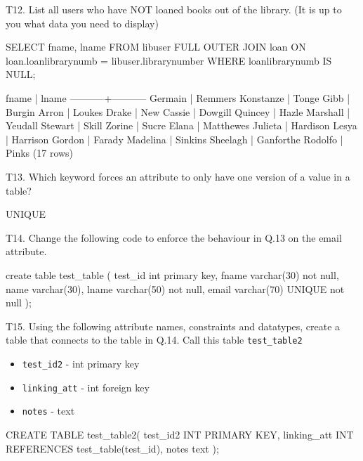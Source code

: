 T12. List all users who have NOT loaned books out of the library. (It is up to you what data you need to display)
\begin{sql}
SELECT fname, lname FROM libuser
FULL OUTER JOIN loan ON loan.loanlibrarynumb = libuser.librarynumber
WHERE loanlibrarynumb IS NULL;
\end{sql}
\begin{pseudo}
   fname   |   lname
-----------+-----------
 Germain   | Remmers
 Konstanze | Tonge
 Gibb      | Burgin
 Arron     | Loukes
 Drake     | New
 Cassie    | Dowgill
 Quincey   | Hazle
 Marshall  | Yeudall
 Stewart   | Skill
 Zorine    | Sucre
 Elana     | Matthewes
 Julieta   | Hardison
 Lesya     | Harrison
 Gordon    | Farady
 Madelina  | Sinkins
 Sheelagh  | Ganforthe
 Rodolfo   | Pinks
(17 rows)
\end{pseudo}


T13. Which keyword forces an attribute to only have one version of a value in a table?
\begin{sql}
UNIQUE
\end{sql}

T14. Change the following code to enforce the behaviour in Q.13 on the email attribute.
\begin{sql}
create table test_table (
    test_id int primary key, 
    fname varchar(30) not null, 
    name varchar(30), 
    lname varchar(50) not null, 
    email varchar(70) UNIQUE not null
);
\end{sql}

T15. Using the following attribute names, constraints and datatypes, create a table that connects to the table in Q.14. Call this table \verb|test_table2|
\begin{itemize}
    \item \verb|test_id2| - int primary key
    \item \verb|linking_att| - int foreign key
    \item \verb|notes| - text
\end{itemize}
\begin{sql}
CREATE TABLE test_table2(
    test_id2 INT PRIMARY KEY,
    linking_att INT REFERENCES test_table(test_id),
    notes text
);
\end{sql}

